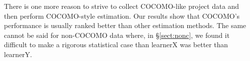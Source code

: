 \documentclass{sig-alternate}
\newcommand{\tion}[1]{\S\ref{sect:#1}}
\begin{document}
There is one more reason to strive to collect COCOMO-like project data and then perform COCOMO-style
estimation.  Our results show that COCOMO's performance is usually
ranked better than other estimation methods. The same cannot be said for non-COCOMO data where,
in \tion{nonc}, 
we found it difficult to make a rigorous statistical case than learnerX was better than learnerY.


 




\end{document}
